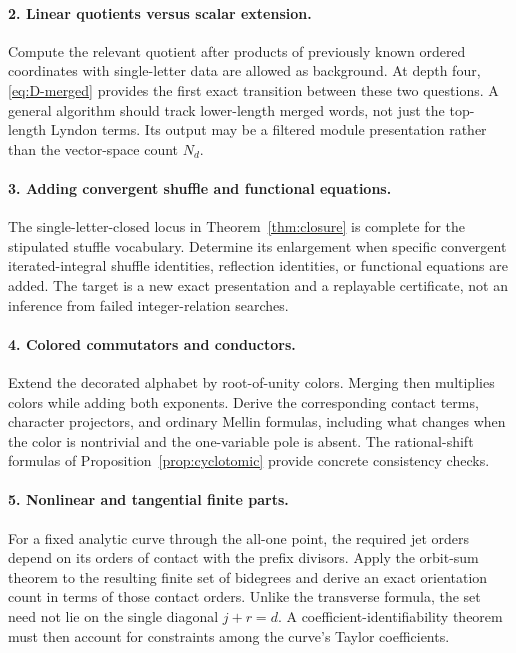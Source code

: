 \documentclass[11pt]{article}
\numberwithin{equation}{section}
\theoremstyle{definition}
\begin{document}
\paragraph{2. Linear quotients versus scalar extension.}
Compute the relevant quotient after products of previously known ordered
coordinates with single-letter data are allowed as background. At depth
four, \eqref{eq:D-merged} provides the first exact transition between
these two questions. A general algorithm should track lower-length merged
words, not just the top-length Lyndon terms. Its output may be a filtered
module presentation rather than the vector-space count $N_d$.

\paragraph{3. Adding convergent shuffle and functional equations.}
The single-letter-closed locus in Theorem~\ref{thm:closure} is complete
for the stipulated stuffle vocabulary. Determine its enlargement when
specific convergent iterated-integral shuffle identities, reflection
identities, or functional equations are added. The target is a new exact
presentation and a replayable certificate, not an inference from failed
integer-relation searches.

\paragraph{4. Colored commutators and conductors.}
Extend the decorated alphabet by root-of-unity colors. Merging then
multiplies colors while adding both exponents. Derive the corresponding
contact terms, character projectors, and ordinary Mellin formulas, including
what changes when the color is nontrivial and the one-variable pole is
absent. The rational-shift formulas of Proposition~\ref{prop:cyclotomic}
provide concrete consistency checks.

\paragraph{5. Nonlinear and tangential finite parts.}
For a fixed analytic curve through the all-one point, the required jet
orders depend on its orders of contact with the prefix divisors. Apply
the orbit-sum theorem to the resulting finite set of bidegrees and derive
an exact orientation count in terms of those contact orders. Unlike the
transverse formula, the set need not lie on the single diagonal $j+r=d$.
A coefficient-identifiability theorem must then account for constraints
among the curve's Taylor coefficients.
\end{document}
